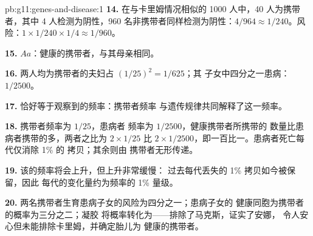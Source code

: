 \begin{solution}{pb:g11:genes-and-disease:1}
\textbf{14.} 在与卡里姆情况相似的 1000 人中，40 人为携带者，其中 4
人检测为阴性，960 名非携带者同样检测为阴性：$4/964 \approx
1/240$。风险：$1 \times 1/240 \times 1/4 \approx 1/960$。

\textbf{15.} $Aa$：健康的携带者，与其母亲相同。

\textbf{16.} 两人均为携带者的夫妇占 $(1/25)^2 = 1/625$；其
子女中四分之一患病：$1/2500$。

\textbf{17.} 恰好等于观察到的频率：携带者频率
与遗传规律共同解释了这一频率。

\textbf{18.} 携带者频率为 $1/25$，患病者
频率为 $1/2500$，健康携带者所携带的
数量比患病者携带的多，两者之比为 $2 \times 1/25$ 比 $2 \times
1/2500$，即一百比一。患病者死亡每代仅消除 1\% 的
拷贝；其余则由
携带者无形传递。

\textbf{19.} 该的频率将会上升，但上升非常缓慢：
过去每代丢失的 1\% 拷贝如今被保留，因此
每代的变化量约为频率的 1\% 量级。

\textbf{20.} 两名携带者生育患病子女的风险为四分之一；患病子女的
健康同胞为携带者的概率为三分之二；凝胶
将概率转化为——排除了马克斯，证实了安娜，
令人安心但未能排除卡里姆，并确定胎儿为
健康的携带者。
\end{solution}

